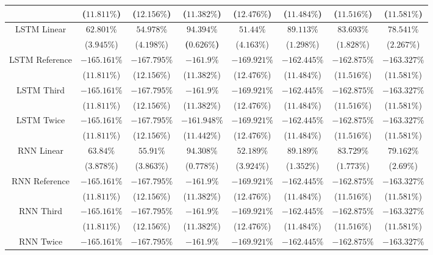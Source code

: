 \begin{table}[!ht]
{\begin{tabular}{|c|c|c|c|c|c|c|c|}
			 & ($11.811\%$) & ($12.156\%$) & ($11.382\%$) & ($12.476\%$) & ($11.484\%$) & ($11.516\%$) & ($11.581\%$) \\ \hline
			\multirow{2}{*}{LSTM Linear} & $62.801\%$ & $54.978\%$ & $\mathbf{94.394\%}$ & $51.44\%$ & $89.113\%$ & $83.693\%$ & $78.541\%$ \\
			 & ($3.945\%$) & ($4.198\%$) & \textbf{(}$\mathbf{0.626\%}$\textbf{)} & ($4.163\%$) & ($1.298\%$) & ($1.828\%$) & ($2.267\%$) \\ \hline
			\multirow{2}{*}{LSTM Reference} & $-165.161\%$ & $-167.795\%$ & $-161.9\%$ & $-169.921\%$ & $-162.445\%$ & $-162.875\%$ & $-163.327\%$ \\
			 & ($11.811\%$) & ($12.156\%$) & ($11.382\%$) & ($12.476\%$) & ($11.484\%$) & ($11.516\%$) & ($11.581\%$) \\ \hline
			\multirow{2}{*}{LSTM Third} & $-165.161\%$ & $-167.795\%$ & $-161.9\%$ & $-169.921\%$ & $-162.445\%$ & $-162.875\%$ & $-163.327\%$ \\
			 & ($11.811\%$) & ($12.156\%$) & ($11.382\%$) & ($12.476\%$) & ($11.484\%$) & ($11.516\%$) & ($11.581\%$) \\ \hline
			\multirow{2}{*}{LSTM Twice} & $-165.161\%$ & $-167.795\%$ & $-161.948\%$ & $-169.921\%$ & $-162.445\%$ & $-162.875\%$ & $-163.327\%$ \\
			 & ($11.811\%$) & ($12.156\%$) & ($11.442\%$) & ($12.476\%$) & ($11.484\%$) & ($11.516\%$) & ($11.581\%$) \\ \hline
			\multirow{2}{*}{RNN Linear} & $63.84\%$ & $55.91\%$ & $94.308\%$ & $52.189\%$ & $89.189\%$ & $83.729\%$ & $79.162\%$ \\
			 & ($3.878\%$) & ($3.863\%$) & ($0.778\%$) & ($3.924\%$) & ($1.352\%$) & ($1.773\%$) & ($2.69\%$) \\ \hline
			\multirow{2}{*}{RNN Reference} & $-165.161\%$ & $-167.795\%$ & $-161.9\%$ & $-169.921\%$ & $-162.445\%$ & $-162.875\%$ & $-163.327\%$ \\
			 & ($11.811\%$) & ($12.156\%$) & ($11.382\%$) & ($12.476\%$) & ($11.484\%$) & ($11.516\%$) & ($11.581\%$) \\ \hline
			\multirow{2}{*}{RNN Third} & $-165.161\%$ & $-167.795\%$ & $-161.9\%$ & $-169.921\%$ & $-162.445\%$ & $-162.875\%$ & $-163.327\%$ \\
			 & ($11.811\%$) & ($12.156\%$) & ($11.382\%$) & ($12.476\%$) & ($11.484\%$) & ($11.516\%$) & ($11.581\%$) \\ \hline
			\multirow{2}{*}{RNN Twice} & $-165.161\%$ & $-167.795\%$ & $-161.9\%$ & $-169.921\%$ & $-162.445\%$ & $-162.875\%$ & $-163.327\%$ \\

\end{tabular}}
\end{table}
